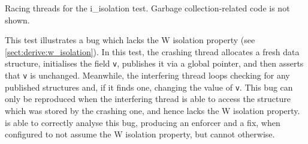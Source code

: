 \begin{sanefig}
  \centerline{
    {\hfill}
    {\hfill}
    {\hfill}
  }
  \caption{Racing threads for the i\_isolation test.  Garbage
    collection-related code is not shown.}
  \label{fig:w_isolation}
\end{sanefig}

This test illustrates a bug which lacks the W isolation property (see
\autoref{sect:derive:w_isolation}).  In this test, the crashing thread
allocates a fresh data structure, initialises the field \texttt{v},
publishes it via a global pointer, and then asserts that \texttt{v} is
unchanged.  Meanwhile, the interfering thread loops checking for any
published structures and, if it finds one, changing the value of
\texttt{v}.  This bug can only be reproduced when the interfering
thread is able to access the structure which was stored by the
crashing one, and hence lacks the W isolation property.
{\Implementation} is able to correctly analyse this bug, producing an
enforcer and a fix, when configured to not assume the W isolation
property, but cannot otherwise.

